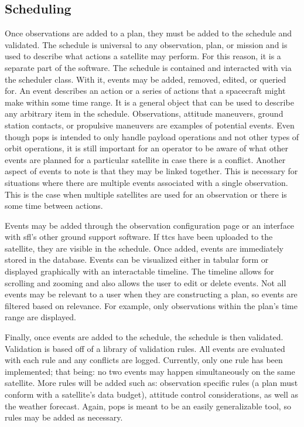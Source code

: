 \subsection{Scheduling}


Once observations are added to a plan, they must be added to the schedule and
validated. The schedule is universal to any observation, plan, or mission and
is used to describe what actions a satellite may perform. For this reason, it
is a separate part of the software. The schedule is contained and interacted
with via the scheduler class. With it, events may be added, removed, edited, or
queried for. An event describes an action or a series of actions that a
spacecraft might make within some time range. It is a general object that can
be used to describe any arbitrary item in the schedule. Observations, attitude
maneuvers, ground station contacts, or propulsive maneuvers are examples of
potential events. Even though \gls{pops} is intended to only handle payload
operations and not other types of orbit operations, it is still important for
an operator to be aware of what other events are planned for a particular
satellite in case there is a conflict. Another aspect of events to note is that
they may be linked together. This is necessary for situations where there are
multiple events associated with a single observation. This is the case when
multiple satellites are used for an observation or there is some time between
actions.  

Events may be added through the observation configuration page or an interface
with \gls{sfl}’s other ground support software. If \glspl{ttc} have been
uploaded to the satellite, they are visible in the schedule. Once added, events
are immediately stored in the database. Events can be visualized either in
tabular form or displayed graphically with an interactable timeline. The
timeline allows for scrolling and zooming and also allows the user to edit or
delete events. Not all events may be relevant to a user when they are
constructing a plan, so events are filtered based on relevance. For example,
only observations within the plan’s time range are displayed.

Finally, once events are added to the schedule, the schedule is then validated.
Validation is based off of a library of validation rules. All events are
evaluated with each rule and any conflicts are logged. Currently, only one rule
has been implemented; that being: no two events may happen simultaneously on
the same satellite. More rules will be added such as: observation specific
rules (a plan must conform with a satellite’s data budget), attitude control
considerations, as well as the weather forecast. Again, \gls{pops} is meant to
be an easily generalizable tool, so rules may be added as necessary.


